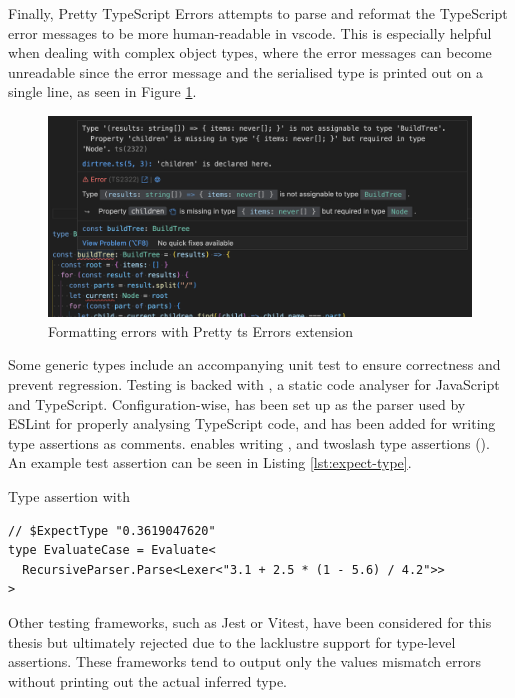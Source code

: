 Finally, Pretty TypeScript Errors \cite{balasianoPrettyTypeScriptErrors2023} attempts to parse and reformat the TypeScript error messages to be more human-readable in \acrshort{vscode}. This is especially helpful when dealing with complex object types, where the error messages can become unreadable since the error message and the serialised type is printed out on a single line, as seen in Figure \ref{fig:pretty-ts-errors}.


\begin{figure}[ht]
  \centering
  \includegraphics[width=\textwidth]{text/testing/pretty-ts-errors.png}
  \caption{Formatting errors with Pretty \acrshort{ts} Errors extension}
  \label{fig:pretty-ts-errors}
\end{figure}

Some generic types include an accompanying unit test to ensure correctness and prevent regression. Testing is backed with \cite{ESLint2023}, a static code analyser for JavaScript and TypeScript. Configuration-wise,  has been set up as the parser used by ESLint for properly analysing TypeScript code, and  has been added for writing type assertions as comments.  enables writing ,  and twoslash type assertions (). An example test assertion can be seen in Listing \ref{lst:expect-type}.

\begin{listing}[ht]
  \caption{Type assertion with }\label{lst:expect-type}
  \begin{verbatim}
// $ExpectType "0.3619047620"
type EvaluateCase = Evaluate<
  RecursiveParser.Parse<Lexer<"3.1 + 2.5 * (1 - 5.6) / 4.2">>
>
\end{verbatim}
\end{listing}

Other testing frameworks, such as Jest or Vitest, have been considered for this thesis but ultimately rejected due to the lacklustre support for type-level assertions. These frameworks tend to output only the values mismatch errors without printing out the actual inferred type.

